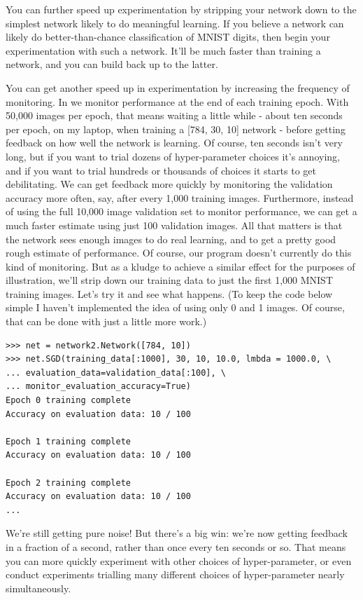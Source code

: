 \documentclass[a4paper,twoside,10pt]{book}
\begin{document}
You can further speed up experimentation by stripping your network down to the simplest network likely to do meaningful learning. If you believe a \inline{[784, 10]} network can likely do better-than-chance classification of MNIST digits, then begin your experimentation with such a network. It'll be much faster than training a \inline{[784, 30, 10]} network, and you can build back up to the latter.

You can get another speed up in experimentation by increasing the frequency of monitoring. In  we monitor performance at the end of each training epoch. With 50,000 images per epoch, that means waiting a little while - about ten seconds per epoch, on my laptop, when training a [784, 30, 10] network - before getting feedback on how well the network is learning. Of course, ten seconds isn't very long, but if you want to trial dozens of hyper-parameter choices it's annoying, and if you want to trial hundreds or thousands of choices it starts to get debilitating. We can get feedback more quickly by monitoring the validation accuracy more often, say, after every 1,000 training images. Furthermore, instead of using the full 10,000 image validation set to monitor performance, we can get a much faster estimate using just 100 validation images. All that matters is that the network sees enough images to do real learning, and to get a pretty good rough estimate of performance. Of course, our program  doesn't currently do this kind of monitoring. But as a kludge to achieve a similar effect for the purposes of illustration, we'll strip down our training data to just the first 1,000 MNIST training images. Let's try it and see what happens. (To keep the code below simple I haven't implemented the idea of using only 0 and 1 images. Of course, that can be done with just a little more work.)
\begin{lstlisting}
>>> net = network2.Network([784, 10])
>>> net.SGD(training_data[:1000], 30, 10, 10.0, lmbda = 1000.0, \
... evaluation_data=validation_data[:100], \
... monitor_evaluation_accuracy=True)
Epoch 0 training complete
Accuracy on evaluation data: 10 / 100

Epoch 1 training complete
Accuracy on evaluation data: 10 / 100

Epoch 2 training complete
Accuracy on evaluation data: 10 / 100
...
\end{lstlisting}
We're still getting pure noise! But there's a big win: we're now getting feedback in a fraction of a second, rather than once every ten seconds or so. That means you can more quickly experiment with other choices of hyper-parameter, or even conduct experiments trialling many different choices of hyper-parameter nearly simultaneously.
\end{document}
